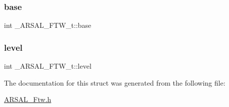 \subsubsection{\texorpdfstring{base}{base}}
{\footnotesize\ttfamily int \+\_\+\+A\+R\+S\+A\+L\+\_\+\+F\+T\+W\+\_\+t\+::base}

\hypertarget{struct__ARSAL__FTW__t_a0c7104a8384913f3cf57ed9abb1e70a6}{}\label{struct__ARSAL__FTW__t_a0c7104a8384913f3cf57ed9abb1e70a6} 
\subsubsection{\texorpdfstring{level}{level}}
{\footnotesize\ttfamily int \+\_\+\+A\+R\+S\+A\+L\+\_\+\+F\+T\+W\+\_\+t\+::level}



The documentation for this struct was generated from the following file\+:\begin{DoxyCompactItemize}
\item 
\hyperlink{ARSAL__Ftw_8h}{A\+R\+S\+A\+L\+\_\+\+Ftw.\+h}\end{DoxyCompactItemize}
